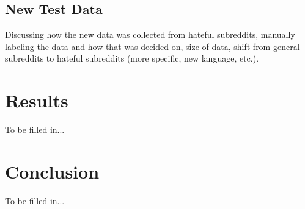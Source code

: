\documentclass[10pt,twocolumn,letterpaper]{article}
\begin{document}
\subsection{New Test Data}
Discussing how the new data was collected from hateful subreddits, manually labeling the data and how that was decided on, size of data, shift from general subreddits to hateful subreddits (more specific, new language, etc.).

\section{Results}
To be filled in...

\section{Conclusion}
To be filled in...



{\small


}
\end{document}
